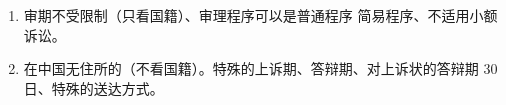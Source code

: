 \begin{enumerate}
\begin{enumerate}
\begin{enumerate}
                  \item 证据的特殊规定。一强调两突破。
                        \begin{enumerate}
                          \item 强调。域外证据均应当在法庭上质证。
                          \item 可以不提交中文译本 = 仅限英文证据 + 对方同意。。
                          \item 可以网上取证、质证。
                        \end{enumerate}
                  \item 结案。
                        \begin{enumerate}
                          \item 自行调解。双方签收后，具有与判决同样的法律效力。。
                          \item 判决。少数服从多数，少数意见可以在裁判文书中载明。
                        \end{enumerate}
                \end{enumerate}
          \item 关于涉外民商事案件管辖若干问题的规定。新增。
                \begin{enumerate}
                  \item 下沉管辖为原则，集中管辖为例外。
                  \item 标的额管辖标准。高院 50 亿以上。中院。
                        \begin{enumerate}
                          \item 有钱的 4000W+  大直辖市 + 东部沿海 5 省（山东、江苏、浙江、福建、广州）。
                          \item 没钱的 2000W+ \yjt 其他省和自治区。
                        \end{enumerate}
                  \item 高院报批最高法后可指定基层 \hz 中院实施区域集中管辖。考不着。
                  \item 例外。环、海、之、声。涉外环境公益诉讼、涉外海事海商、涉外知识产权、涉外生态环境民事赔偿。
                \end{enumerate}
        \end{enumerate}
  \item 审期不受限制（只看国籍）、审理程序可以是普通程序 \hz 简易程序、不适用小额诉讼。
  \item 在中国无住所的（不看国籍）。特殊的上诉期、答辩期、对上诉状的答辩期 30 日、特殊的送达方式。

\end{enumerate}

